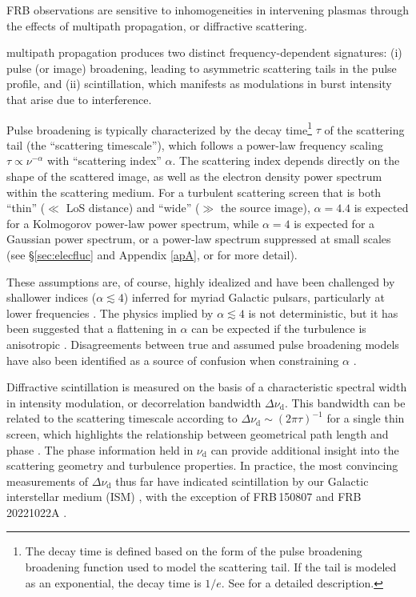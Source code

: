 \documentclass[twocolumn, linenumbers, tra]{aastex631}
\newcommand{\rev}[1]{{\color{purple}#1}}
\begin{document}
FRB observations are sensitive to inhomogeneities in intervening plasmas through the effects of multipath propagation, or \rev{diffractive} scattering. \rev{multipath propagation produces two distinct frequency-dependent signatures: (i) pulse (or image) broadening, leading to asymmetric scattering tails in the pulse profile, and (ii) scintillation, which manifests as modulations in burst intensity that arise due to interference. 

Pulse broadening is typically characterized by the decay time\footnote{The decay time is defined based on the form of the pulse broadening broadening function used to model the scattering tail. If the tail is modeled as an exponential, the decay time is $1/e$. See \citet{Geiger2024} for a detailed description.} $\tau$ of the scattering tail (the ``scattering timescale''), which follows a power-law frequency scaling $\tau \propto \nu^{-\alpha}$ with ``scattering index'' $\alpha$. The scattering index depends directly on the shape of the scattered image, as well as the electron density power spectrum within the scattering medium. For a turbulent scattering screen that is both ``thin'' ($\ll$ LoS distance) and ``wide'' ($\gg$ the source image), $\alpha = 4.4$ is expected for a Kolmogorov power-law power spectrum, while $\alpha = 4$ is expected for a Gaussian power spectrum, or a power-law spectrum suppressed at small scales (see \S\ref{sec:elecfluc} and Appendix \ref{apA}, or \citet{Rickett1977} for more detail).

These assumptions are, of course, highly idealized and have been challenged by shallower indices ($\alpha \lesssim 4$) inferred for myriad Galactic pulsars, particularly at lower frequencies \citep{Lohmer2001, Deneva2009, Geyer2016, Dexter2017}. The physics implied by $\alpha \lesssim 4$ is not deterministic, but it has been suggested that a flattening in $\alpha$ can be expected if the turbulence is anisotropic \citep{Tuntsov2013}. Disagreements between true and assumed pulse broadening models have also been identified as a source of confusion when constraining $\alpha$ \citep{Geiger2024}.}

Diffractive scintillation is measured on the basis of a characteristic spectral width in intensity modulation, or decorrelation bandwidth $\Delta \nu_{\mathrm{d}}$. This bandwidth can be related to the scattering timescale according to $\Delta \nu_{\mathrm{d}} \sim (2 \pi \tau)^{-1}$ for a single thin screen, which highlights the relationship between geometrical path length and phase \citep[][]{Sutton1971}. The phase information held in $\nu_{\mathrm{d}}$ can provide additional insight into the scattering geometry and turbulence properties. In practice, the most convincing measurements of $\Delta \nu_{\mathrm{d}}$ thus far have indicated scintillation by our Galactic interstellar medium (ISM) \citep{Masui2015, Gajjar2018, Hessels2019, Marcote2020, Bhandari2020, Schoen2021, Ocker2022a, Sammons2023}, with the exception of FRB\,150807 \citep{Ravi2016} and FRB\,20221022A \citep{Nimmo2025}. 
\end{document}
